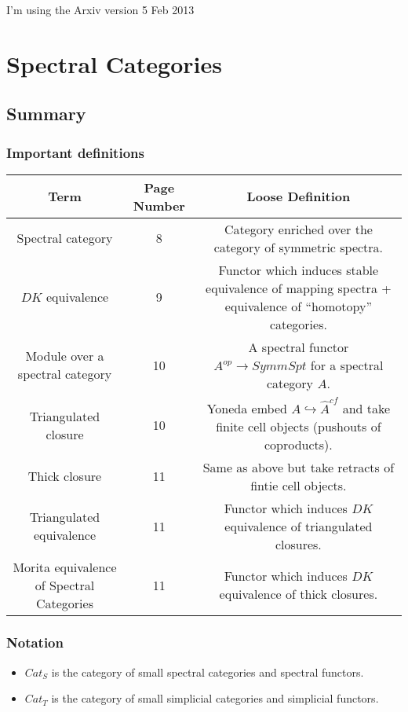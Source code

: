 \documentclass[letterpaper]{article}
\theoremstyle{definition}
\begin{document}
I'm using the Arxiv version 5 Feb 2013

\tableofcontents

\section{Spectral Categories}

\subsection{Summary}
\subsubsection{Important definitions}
\begin{tabulary}{0.7 \textwidth}{|C|C|C|}
\hline
Term & Page Number & Loose Definition\\
\hline
\hline
Spectral category & 8& Category enriched over the category of
                       symmetric spectra.\\
\hline
$DK$ equivalence &9& Functor which induces stable equivalence of mapping spectra +
                       equivalence of ``homotopy'' categories.\\
\hline
Module over a spectral category &10& A spectral functor $A^{op}
                                     \rightarrow SymmSpt$ for a spectral
                                     category $A$.\\
\hline
Triangulated closure &10 & Yoneda embed $A \hookrightarrow \widehat
                           A^{cf}$ and take finite cell objects
                           (pushouts of coproducts).\\
\hline
Thick closure &11 & Same as above but take retracts of fintie cell objects.\\
\hline
Triangulated equivalence  & 11& Functor which induces $DK$ equivalence of
                                triangulated closures.\\
\hline
Morita equivalence of Spectral Categories & 11& Functor which induces $DK$ equivalence of thick closures.\\
\hline
\end{tabulary}

\subsubsection{Notation}
\begin{itemize}
\item $Cat_S$ is the category of small spectral categories and
  spectral functors.
\item $Cat_T$ is the category of small simplicial categories and
  simplicial functors.
\end{itemize}
\end{document}
